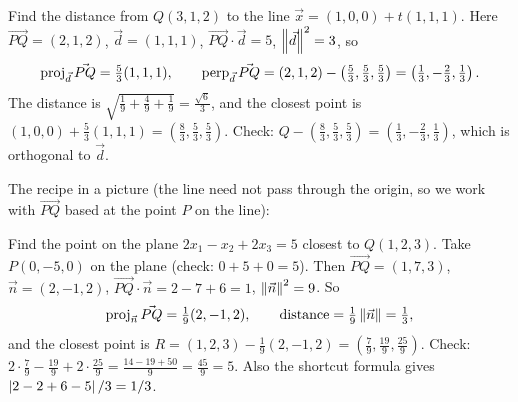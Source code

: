 \begin{example}
Find the distance from $Q(3,1,2)$ to the line $\vec x = (1,0,0)+t(1,1,1)$.
Here $\vec{PQ}=(2,1,2)$, $\vec d=(1,1,1)$, $\vec{PQ}\cdot\vec d = 5$, $\left\lVert \vec d \right\rVert^2=3$, so
\[
  \operatorname{proj}_{\vec d}\vec{PQ} = \tfrac53(1,1,1),\qquad
  \operatorname{perp}_{\vec d}\vec{PQ} = (2,1,2)-\left(\tfrac53,\tfrac53,\tfrac53\right)=\left(\tfrac13,-\tfrac23,\tfrac13\right).
\]
The distance is $\sqrt{\frac19+\frac49+\frac19}=\frac{\sqrt6}{3}$, and the closest point is
$(1,0,0)+\frac53(1,1,1)=\left(\frac83,\frac53,\frac53\right)$. Check:
$Q-\left(\frac83,\frac53,\frac53\right)=\left(\frac13,-\frac23,\frac13\right)$, which is orthogonal to $\vec d$.
\end{example}

The recipe in a picture (the line need not pass through the origin, so we work with
$\vec{PQ}$ based at the point $P$ on the line):
\begin{center}
\end{center}

\begin{example}
Find the point on the plane $2x_1-x_2+2x_3=5$ closest to $Q(1,2,3)$. Take $P(0,-5,0)$ on the
plane (check: $0+5+0=5$). Then $\vec{PQ}=(1,7,3)$, $\vec n=(2,-1,2)$,
$\vec{PQ}\cdot\vec n = 2-7+6 = 1$, $\left\lVert \vec n \right\rVert^2 = 9$. So
\[
  \operatorname{proj}_{\vec n}\vec{PQ} = \tfrac19(2,-1,2), \qquad \text{distance} = \tfrac19\left\lVert \vec n \right\rVert=\tfrac13,
\]
and the closest point is $R = (1,2,3)-\frac19(2,-1,2) = \left(\frac79,\frac{19}9,\frac{25}9\right)$.
Check: $2\cdot\frac79-\frac{19}9+2\cdot\frac{25}9 = \frac{14-19+50}{9}=\frac{45}{9}=5$. Also the shortcut
formula gives $\left\lvert 2-2+6-5 \right\rvert/3 = 1/3$.
\end{example}

